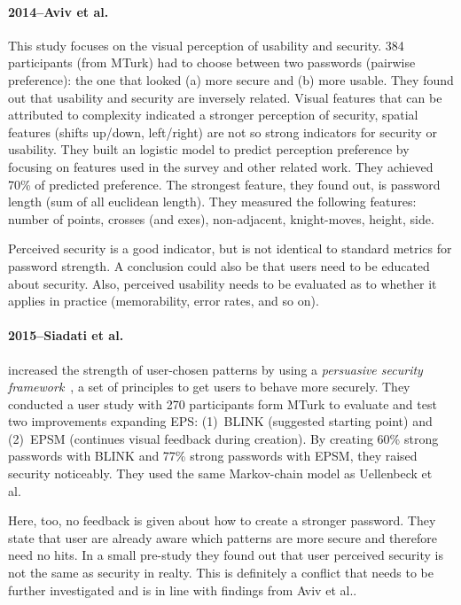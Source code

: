 \documentclass[twocolumn, a4paper, 10pt]{article}
\begin{document}
\paragraph{2014--Aviv et al.~\cite{Aviv:2014:UVP:2664243.2664253}}
This study focuses on the visual perception of usability and security. 384 participants (from MTurk) had to choose between two passwords (pairwise preference): the one that looked (a) more secure and (b) more usable. They found out that usability and security are inversely related. Visual features that can be attributed to complexity indicated a stronger perception of security, spatial features (shifts up/down, left/right) are not so strong indicators for security or usability. They built an logistic model to predict perception preference by focusing on features used in the survey and other related work. They achieved 70\%  of predicted preference. The strongest feature, they found out, is password length (sum of all euclidean length). They measured the following features: number of points, crosses (and exes), non-adjacent, knight-moves, height, side.

Perceived security is a good indicator, but is not identical to standard metrics for password strength. A conclusion could also be that users need to be educated about security. Also, perceived usability needs to be evaluated as to whether it applies in practice (memorability, error rates, and so on).

\paragraph{2015--Siadati et al.~\cite{siadati2015fortifying}}
increased the strength of user-chosen patterns by using a \textit{persuasive security framework}~\cite{forget2007persuasion, forget2008persuasion}, a set of principles to get users to behave more securely. They conducted a user study with 270 participants form MTurk to evaluate and test
two improvements expanding EPS: (1)~BLINK (suggested starting point) and (2)~EPSM (continues visual feedback during creation). By creating 60\% strong passwords with BLINK and 77\% strong passwords with EPSM, they raised security noticeably. They used the same Markov-chain model as Uellenbeck et al.~\cite{Uellenbeck:2013:QSG:2508859.2516700}

Here, too, no feedback is given about how to create a stronger password.
They state that user are already aware which patterns are more secure and therefore need no hits. In a small pre-study they found out that user perceived security is not the same as security in realty. This is definitely a conflict that needs to be further investigated and is in line with findings from Aviv et al.\cite{Aviv:2014:UVP:2664243.2664253}.
\end{document}
